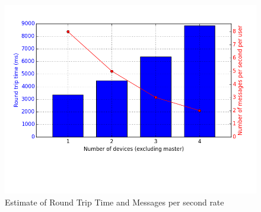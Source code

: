 \begin{figure}[ht!]
  \centering
  \includegraphics[width=1.0\textwidth]{img/messages_per_second.png} 
  \caption{Estimate of Round Trip Time and Messages per second rate}
  \label{figure:messages-per-second}
\end{figure}